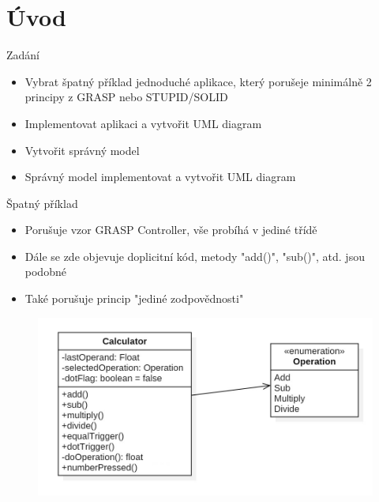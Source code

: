 \section{Úvod}
\begin{frame}
	\vfill
		\begin{block}{Zadání}
    \begin{itemize}
        \item Vybrat špatný příklad jednoduché aplikace, který porušeje minimálně 2 principy z GRASP nebo STUPID/SOLID
        \item Implementovat aplikaci a vytvořit UML diagram
        \item Vytvořit správný model
        \item Správný model implementovat a vytvořit UML diagram
      \end{itemize}
    \end{block}
\end{frame}
\begin{frame}
	\vfill
	\begin{block}{Špatný příklad}
		\begin{itemize}
			\item Porušuje vzor GRASP Controller, vše probíhá v jediné třídě
			\item Dále se zde objevuje doplicitní kód, metody "add()", "sub()", atd. jsou podobné
			\item Také porušuje princip "jediné zodpovědnosti"
		\end{itemize}
	\end{block}
		\begin{figure}[!ht]
	\begin{center}
		\includegraphics[scale=0.80]{obr/badmodel.jpg}
	\end{center}
\end{figure}
\end{frame}
